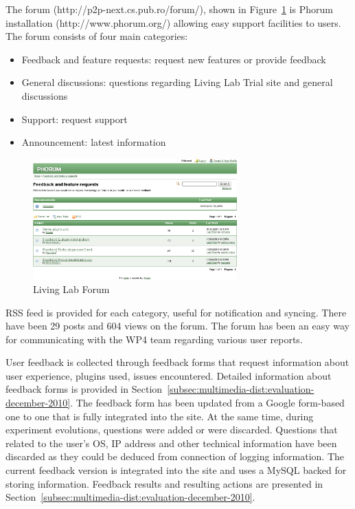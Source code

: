 The forum (http://p2p-next.cs.pub.ro/forum/), shown in
Figure~\ref{fig:multimedia-dist:upb-living-lab-forum} is Phorum installation (http://www.phorum.org/) allowing easy support facilities to users. The forum consists of four main categories:
\begin{itemize}
  \item Feedback and feature requests: request new features or provide
  feedback
  \item General discussions: questions regarding Living Lab Trial site and general discussions
  \item Support: request support
  \item Announcement: latest information
\end{itemize}

\begin{figure}
  \centering
  \includegraphics[width=0.7\textwidth]{src/img/multimedia-dist/upb-living-lab-forum}
  \caption{Living Lab Forum}
  \label{fig:multimedia-dist:upb-living-lab-forum}
\end{figure}

RSS feed is provided for each category, useful for notification and syncing.
There have been 29 posts and 604 views on the forum. The forum has been an
easy way for communicating with the WP4 team regarding various user reports.

User feedback is collected through feedback forms that request information
about user experience, plugins used, issues encountered. Detailed information
about feedback forms is provided in
Section~\ref{subsec:multimedia-dist:evaluation-december-2010}. The feedback
form has been updated from a Google form-based one to one that is fully
integrated into the site. At the same time, during experiment evolutions,
questions were added or were discarded. Questions that related to the user's
OS, IP address and other technical information have been discarded as they
could be deduced from connection of logging information. The current feedback
version is integrated into the site and uses a MySQL backed for storing
information. Feedback results and resulting actions are presented in
Section~\ref{subsec:multimedia-dist:evaluation-december-2010}.

